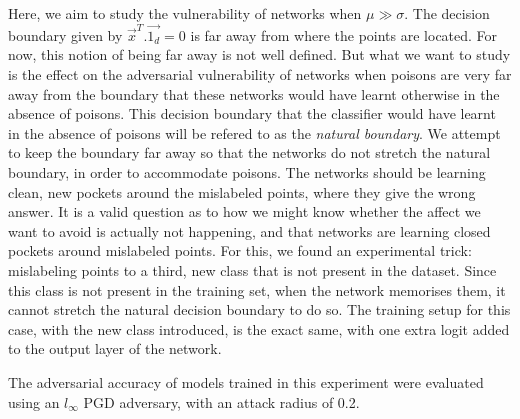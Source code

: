 \documentclass[12pt, oneside]{book}
\begin{document}
Here, we aim to study the vulnerability of networks when $\mu \gg \sigma$. The
decision boundary given by $\vec{x}^T.\vec{1_d} = 0$ is far away from where the
points are located. For now, this notion of being far away is not well defined.
But what we want to study is the effect on the adversarial vulnerability of
networks when poisons are very far away from the boundary that these networks
would have learnt otherwise in the absence of poisons. This decision boundary
that the classifier would have learnt in the absence of poisons will be refered
to as the \emph{natural boundary}. We attempt to keep the boundary far away so
that the networks do not stretch the natural boundary, in order to accommodate
poisons. The networks should be learning clean, new pockets around the
mislabeled points, where they give the wrong answer. It is a valid question as
to how we might know whether the affect we want to avoid is actually not
happening, and that networks are learning closed pockets around mislabeled
points. For this, we found an experimental trick: mislabeling points to a third,
new class that is not present in the dataset. Since this class is not present in
the training set, when the network memorises them, it cannot stretch the natural
decision boundary to do so. The training setup for this case, with the new class
introduced, is the exact same, with one extra logit added to the output layer of
the network.

The adversarial accuracy of models trained in this experiment were evaluated
using an $l_\infty$ PGD adversary, with an attack radius of 0.2.
\end{document}
